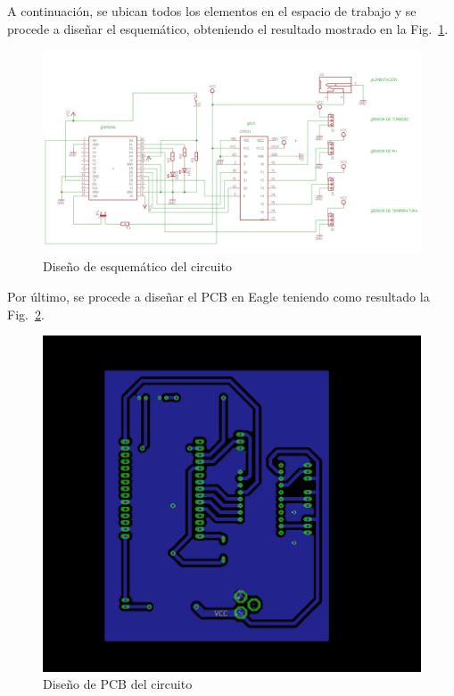 \documentclass[10pt,a4paper]{article}
\begin{document}
A continuación, se ubican todos los elementos en el espacio de trabajo y se procede a diseñar el esquemático, obteniendo el resultado mostrado en la Fig.~\ref{esquematic}.
\begin{figure}[H]
\centering
\includegraphics[scale=0.48]{eagle.png}
\caption{Diseño de esquemático del circuito}
\label{esquematic}
\end{figure}

Por último, se procede a diseñar el PCB en Eagle teniendo como resultado la Fig.~\ref{pcb_Eagle}.

\begin{figure}[H]
\centering
\includegraphics[scale=0.35]{pcb_eagle}
\caption{Diseño de PCB del circuito}
\label{pcb_Eagle}
\end{figure}
\end{document}
